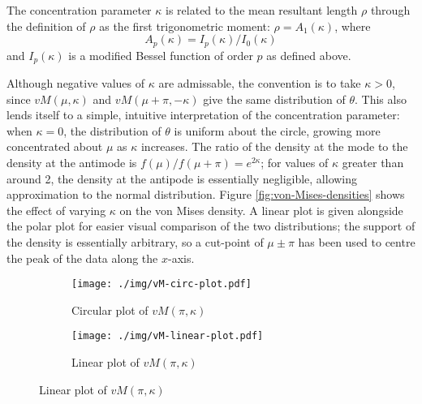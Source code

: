 \documentclass[../../ArchStats.tex]{subfiles}
\begin{document}
The concentration parameter $\kappa$ is related to the mean resultant length $\rho$ through the definition of $\rho$ as the first trigonometric moment: $\rho = A_1(\kappa)$, where
	\begin{equation}
	A_p(\kappa) = I_p(\kappa)/I_0(\kappa)
	\end{equation}
and $I_p(\kappa)$ is a modified Bessel function of order $p$ as defined above.

Although negative values of $\kappa$ are admissable, the convention is to take $\kappa > 0$, since $vM(\mu, \kappa)$ and $vM(\mu + \pi, -\kappa)$ give the same distribution of $\theta$. This also lends itself to a simple, intuitive interpretation of the concentration parameter: when $\kappa = 0$, the distribution of $\theta$ is uniform about the circle, growing more concentrated about $\mu$ as $\kappa$ increases.  The ratio of the density at the mode to the density at the antimode is $f(\mu) / f(\mu + \pi) = e^{2\kappa}$; for values of $\kappa$ greater than around 2, the density at the antipode is essentially negligible, allowing approximation to the normal distribution. Figure \ref{fig:von-Mises-densities} shows the effect of varying $\kappa$ on the von Mises density. A linear plot is given alongside the polar plot for easier visual comparison of the two distributions; the support of the density is essentially arbitrary, so a cut-point of $\mu \pm \pi$ has been used to centre the peak of the data along the $x$-axis.
 
\begin{figure}[!h]
\centering
\caption{von Mises densities with $\mu = \pi$ and varying $\kappa$.}
\label{fig:von-Mises-densities}
%
\begin{subfigure}[t]{0.4\textwidth}
\centering
\caption{Circular plot of $vM(\pi, \kappa)$}
\texttt{[image: ./img/vM-circ-plot.pdf]}
\end{subfigure}
%
\begin{subfigure}[t]{0.4\textwidth}
\centering
\caption{Linear plot of $vM(\pi, \kappa)$}
\texttt{[image: ./img/vM-linear-plot.pdf]}
\end{subfigure}
%
\end{figure}

\end{document}
